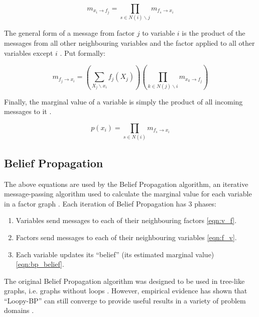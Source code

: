 \begin{equation}
    m_{x_i \rightarrow f_j} = \underset{s \in N(i) \backslash j }{\prod} m_{f_s \rightarrow x_i}
    \label{eqn:v_f}
\end{equation}

The general form of a message from factor $j$ to variable $i$ is the product of the messages from all other neighbouring variables and the factor applied to all other variables except $i$ \cite{GaussianBP}. Put formally:

\begin{equation}
    m_{f_j \rightarrow x_i} = \left(\underset{X_j \backslash x_i}{\sum} f_j(X_j)\right) \left(\underset{k \in N(j) \backslash i}{\prod} m_{x_k \rightarrow f_j}\right)
    \label{eqn:f_v}
\end{equation}

Finally, the marginal value of a variable is simply the product of all incoming messages to it \cite{GaussianBP}.

\begin{equation}
    p(x_i) = \underset{s \in N(i)}{\prod} m_{f_s \rightarrow x_i}
    \label{eqn:bp_belief}
\end{equation}

\subsection{Belief Propagation}
The above equations are used by the Belief Propagation algorithm, an iterative message-passing algorithm used to calculate the marginal value for each variable in a factor graph \cite{GaussianBP}. Each iteration of Belief Propagation has 3 phases:

\begin{enumerate}
    \item Variables send messages to each of their neighbouring factors \ref{eqn:v_f}.
    \item Factors send messages to each of their neighbouring variables \ref{eqn:f_v}.
    \item Each variable updates its ``belief'' (its estimated marginal value) \ref{eqn:bp_belief}.
\end{enumerate}

The original Belief Propagation algorithm was designed to be used in tree-like graphs, i.e. graphs without loops \cite{GaussianBP}. However, empirical evidence has shown that ``Loopy-BP'' can still converge to provide useful results in a variety of problem domains \cite{GaussianBP}. %

